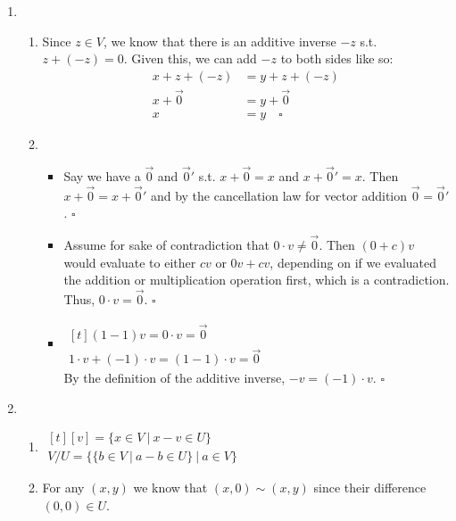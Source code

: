 \documentclass[12pt]{article}
\begin{document}
\begin{enumerate}
    \item \begin{enumerate}
              \item Since $z \in V$, we know that there is an additive inverse $-z$ s.t. $z+(-z)=0$.
                    Given this, we can add $-z$ to both sides like so:
                    \begin{align*}
                        x+z+(-z)  & =y+z+(-z)      \\
                        x+\vec{0} & =y+\vec{0}     \\
                        x         & =y\quad\square
                    \end{align*}
              \item \begin{itemize}
                        \item Say we have a $\vec{0}$ and $\vec{0}'$ s.t. $x+\vec{0}=x$ and $x+\vec{0}'=x$.
                              Then $x+\vec{0}=x+\vec{0}'$ and by the cancellation law for vector addition $\vec{0}=\vec{0}'$. $\square$
                        \item Assume for sake of contradiction that $0 \cdot v \ne \vec{0}$.
                              Then $(0+c)v$ would evaluate to either $cv$ or $0v+cv$, depending on if we evaluated the addition
                              or multiplication operation first, which is a contradiction.
                              Thus, $0 \cdot v = \vec{0}$. $\square$
                        \item \hfill$\begin{gathered}[t]
                                      (1-1)v=0\cdot v=\vec{0} \\
                                      1 \cdot v + (-1) \cdot v = (1-1) \cdot v=\vec{0}
                                  \end{gathered}$\hfill\null \\
                              By the definition of the additive inverse, $-v=(-1) \cdot v$. $\square$
                    \end{itemize}
          \end{enumerate}
    \item \begin{enumerate}
              \item \hfill$\begin{gathered}[t]
                            [v]=\{x \in V\ |\ x-v \in U\} \\
                            V/U=\{\{b \in V\ |\ a-b \in U\}\ |\ a \in V\}
                        \end{gathered}$\hfill\null
              \item For any $(x,y)$ we know that $(x,0) \sim (x,y)$ since their difference $(0,0) \in U$.


\end{enumerate}
\end{enumerate}
\end{document}
